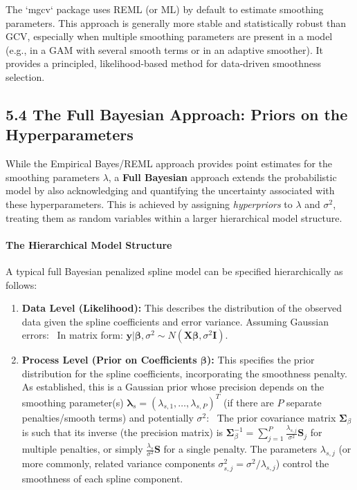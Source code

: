 \documentclass[11pt, a4paper]{article}
\begin{document}
\begin{itemize}
The `mgcv` package uses REML (or ML) by default to estimate smoothing parameters. This approach is generally more stable and statistically robust than GCV, especially when multiple smoothing parameters are present in a model (e.g., in a GAM with several smooth terms or in an adaptive smoother). It provides a principled, likelihood-based method for data-driven smoothness selection.

\subsection{5.4 The Full Bayesian Approach: Priors on the Hyperparameters}
While the Empirical Bayes/REML approach provides point estimates for the smoothing parameters $\lambda$, a \textbf{Full Bayesian} approach extends the probabilistic model by also acknowledging and quantifying the uncertainty associated with these hyperparameters. This is achieved by assigning \textit{hyperpriors} to $\lambda$ and $\sigma^2$, treating them as random variables within a larger hierarchical model structure.

\paragraph{The Hierarchical Model Structure}
A typical full Bayesian penalized spline model can be specified hierarchically as follows:
\begin{enumerate}
 \item \textbf{Data Level (Likelihood):} This describes the distribution of the observed data given the spline coefficients and error variance. Assuming Gaussian errors:
 \
 In matrix form: $\mathbf{y} | \boldsymbol{\beta}, \sigma^2 \sim N(\mathbf{X}\boldsymbol{\beta}, \sigma^2\mathbf{I})$.

 \item \textbf{Process Level (Prior on Coefficients $\boldsymbol{\beta}$):} This specifies the prior distribution for the spline coefficients, incorporating the smoothness penalty. As established, this is a Gaussian prior whose precision depends on the smoothing parameter(s) $\boldsymbol{\lambda}_s = (\lambda_{s,1}, \dots, \lambda_{s,P})^T$ (if there are $P$ separate penalties/smooth terms) and potentially $\sigma^2$:
 \
 The prior covariance matrix $\boldsymbol{\Sigma}_{\beta}$ is such that its inverse (the precision matrix) is $\boldsymbol{\Sigma}_{\beta}^{-1} = \sum_{j=1}^P \frac{\lambda_{s,j}}{\sigma^2} \mathbf{S}_j$ for multiple penalties, or simply $\frac{\lambda_s}{\sigma^2}\mathbf{S}$ for a single penalty. The parameters $\lambda_{s,j}$ (or more commonly, related variance components $\sigma^2_{s,j} = \sigma^2/\lambda_{s,j}$) control the smoothness of each spline component.


\end{enumerate}
\end{itemize}
\end{document}
